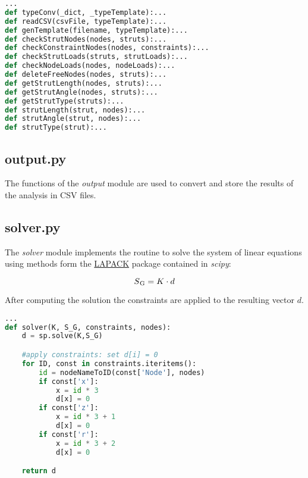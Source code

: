 \begin{inconsolata}
\begin{minipage}{\linewidth}
\begin{lstlisting}[language=python]
...
def typeConv(_dict, _typeTemplate):...
def readCSV(csvFile, typeTemplate):...
def genTemplate(filename, typeTemplate):...
def checkStrutNodes(nodes, struts):...
def checkConstraintNodes(nodes, constraints):...
def checkStrutLoads(struts, strutLoads):...
def checkNodeLoads(nodes, nodeLoads):...
def deleteFreeNodes(nodes, struts):...
def getStrutLength(nodes, struts):...
def getStrutAngle(nodes, struts):...
def getStrutType(struts):...
def strutLength(strut, nodes):...
def strutAngle(strut, nodes):...
def strutType(strut):...
\end{lstlisting}
\end{minipage}
\end{inconsolata}

\subsection{output.py}
\label{subsec:output.py}

The functions of the \textit{output} module are used to convert and store the results of the analysis in CSV files.

\pagebreak

\subsection{solver.py}
\label{subsec:solver.py}

The \textit{solver} module implements the routine to solve the system of linear equations using methods form the \href{http://www.netlib.org/lapack/}{LAPACK} package contained in \textit{scipy}:

\begin{equation}
S\textsubscript{G} = K \cdot d
\end{equation}

After computing the solution the constraints are applied to the resulting vector $d$.

\begin{inconsolata}
\begin{minipage}{\linewidth}
\begin{lstlisting}[language=python]
...
def solver(K, S_G, constraints, nodes):
    d = sp.solve(K,S_G)

    #apply constraints: set d[i] = 0
    for ID, const in constraints.iteritems():
        id = nodeNameToID(const['Node'], nodes)
        if const['x']:
            x = id * 3
            d[x] = 0
        if const['z']:
            x = id * 3 + 1
            d[x] = 0
        if const['r']:
            x = id * 3 + 2
            d[x] = 0

    return d
\end{lstlisting}
\end{minipage}
\end{inconsolata}

